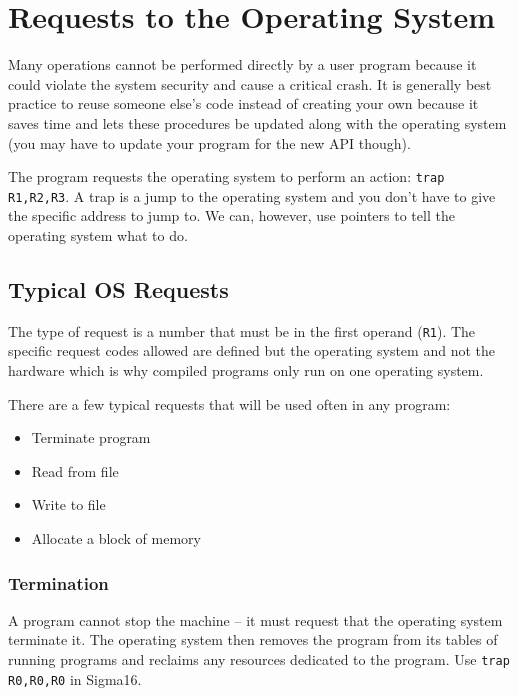 \section{Requests to the Operating System}\label{sec:requests_to_the_operating_system}

Many operations cannot be performed directly by a user program because it could violate the system security and cause a critical crash.
It is generally best practice to reuse someone else's code instead of creating your own because it saves time and lets these procedures be updated along with the operating system (you may have to update your program for the new API though).

The program requests the operating system to perform an action: \texttt{trap R1,R2,R3}.
A trap is a jump to the operating system and you don't have to give the specific address to jump to.
We can, however, use pointers to tell the operating system what to do.

\subsection{Typical OS Requests}\label{sub:typical_os_requests}

The type of request is a number that must be in the first operand (\texttt{R1}).
The specific request codes allowed are defined but the operating system and not the hardware which is why compiled programs only run on one operating system.

There are a few typical requests that will be used often in any program:
\begin{itemize}
    \item Terminate program
    \item Read from file
    \item Write to file
    \item Allocate a block of memory
\end{itemize}

\subsubsection{Termination}\label{ssub:termination}

A program cannot stop the machine -- it must request that the operating system terminate it.
The operating system then removes the program from its tables of running programs and reclaims any resources dedicated to the program.
Use \texttt{trap R0,R0,R0} in Sigma16.

